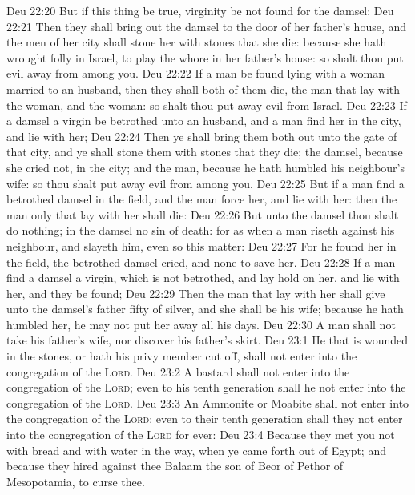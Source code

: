 \vs Deu 22:20 But if this thing be true,  virginity be not found for the damsel:
\vs Deu 22:21 Then they shall bring out the damsel to the door of her father's house, and the men of her city shall stone her with stones that she die: because she hath wrought folly in Israel, to play the whore in her father's house: so shalt thou put evil away from among you.
\vs Deu 22:22 If a man be found lying with a woman married to an husband, then they shall both of them die,  the man that lay with the woman, and the woman: so shalt thou put away evil from Israel.
\vs Deu 22:23 If a damsel  a virgin be betrothed unto an husband, and a man find her in the city, and lie with her;
\vs Deu 22:24 Then ye shall bring them both out unto the gate of that city, and ye shall stone them with stones that they die; the damsel, because she cried not,  in the city; and the man, because he hath humbled his neighbour's wife: so thou shalt put away evil from among you.
\vs Deu 22:25 But if a man find a betrothed damsel in the field, and the man force her, and lie with her: then the man only that lay with her shall die:
\vs Deu 22:26 But unto the damsel thou shalt do nothing;  in the damsel no sin  of death: for as when a man riseth against his neighbour, and slayeth him, even so  this matter:
\vs Deu 22:27 For he found her in the field,  the betrothed damsel cried, and  none to save her.
\vs Deu 22:28 If a man find a damsel  a virgin, which is not betrothed, and lay hold on her, and lie with her, and they be found;
\vs Deu 22:29 Then the man that lay with her shall give unto the damsel's father fifty  of silver, and she shall be his wife; because he hath humbled her, he may not put her away all his days.
\vs Deu 22:30 A man shall not take his father's wife, nor discover his father's skirt.
\vs Deu 23:1 He that is wounded in the stones, or hath his privy member cut off, shall not enter into the congregation of the \textsc{Lord}.
\vs Deu 23:2 A bastard shall not enter into the congregation of the \textsc{Lord}; even to his tenth generation shall he not enter into the congregation of the \textsc{Lord}.
\vs Deu 23:3 An Ammonite or Moabite shall not enter into the congregation of the \textsc{Lord}; even to their tenth generation shall they not enter into the congregation of the \textsc{Lord} for ever:
\vs Deu 23:4 Because they met you not with bread and with water in the way, when ye came forth out of Egypt; and because they hired against thee Balaam the son of Beor of Pethor of Mesopotamia, to curse thee.
